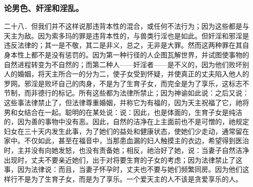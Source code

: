 
\subsubsection{论男色、奸淫和淫乱。}

二十八．但我们并不这样说那违背本性的混合，或任何不法行为；因为这些都是与天主为敌。因为索多玛的罪是违背本性的，与兽类行淫也是如此。但奸淫和邪淫是违反法律的；其一是不敬，其二是非义，总之，无非是大罪。然而这两种罪在其自身本性上都不是没有惩罚的。因为第一种行径的人企图瓦解世界，并试图使事物的自然进程转变为不自然的；而第二种人——奸淫者——是不义的，因为他们败坏别人的婚姻，将天主所合一的分为二，使子女受到怀疑，并使真正的丈夫陷入他人的罗网。邪淫是败坏自己的肉身，不是为了生育子女，而完全是为了享乐，这标志不节制，而非德行的标记。所有这些都为法律所禁止；因为神谕如此说：\newline{}\newline{}\newline{}\newline{}\newline{}之后又说：\newline{}\newline{}这些事法律禁止了，但法律尊重婚姻，并称它为有福的，因为天主祝福了它，祂将男和女结合在一起。聪明的在某处说：说：因此，也是体面的，生育子女是纯洁的，因为善的事物中没有恶。因此，自然的洁净在上主面前也不是可憎的，祂规定妇女在三十天内发生此事，为了她们的益处和健康状态，使她们少走动，通常留在家中。不仅如此，甚至在福音中，当那患血漏的妇人触摸主的衣边，希望得到医治时，主并没有向她发怒，也没有责备她；相反，祂治好了她，说：当妻子自然洁净出现时，丈夫不要亲近她们，出于对将要生育的子女的考虑；因为法律禁止了这事，因为法律说：而且，当妻子怀孕时，丈夫也不要与她们频繁同房。因为他们这样行不是为了生育子女，而是为了享乐。一个爱天主的人不该是贪爱享乐的人。\par

